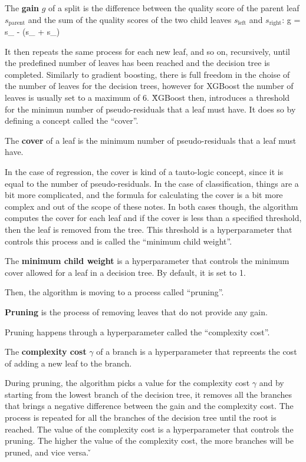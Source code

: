 \bd[Gain]
The \textbf{gain} $g$ of a split is the difference between the quality score of the parent leaf $s_{\text{parent}}$ and
the sum of the quality scores of the two child leaves $s_{\text{left}}$ and $s_{\text{right}}$:
\bse
g = s_{} - (s_{} + s_{})
\ese
\ed

It then repeats the same process for each new leaf, and so on, recursively, until the predefined number of
leaves has been reached and the decision tree is completed. Similarly to gradient boosting, there is full freedom in the
choise of the number of leaves for the decision trees, however for XGBoost the number of leaves is usually set to a
maximum of 6. \v

XGBoost then, introduces a threshold for the minimun number of pseudo-residuals that a leaf must have. It does so by
defining a concept called the ``cover''.

\bd[Cover]
The \textbf{cover} of a leaf is the minimum number of pseudo-residuals that a leaf must have.
\ed

In the case of regression, the cover is kind of a tauto-logic concept, since it is equal to the number of
pseudo-residuals. In the case of classification, things are a bit more complicated, and the formula for calculating
the cover is a bit more complex and out of the scope of these notes. In both cases though, the algorithm computes
the cover for each leaf and if the cover is less than a specified threshold, then the leaf is removed from the tree.
This threshold is a hyperparameter that controls this process and is called the ``minimum child weight''.

The \textbf{minimum child weight} is a hyperparameter that controls the minimum cover allowed for a leaf in a decision
tree. By default, it is set to 1.
\ed

Then, the algorithm is moving to a process called ``pruning''.

\bd[Pruning]
\textbf{Pruning} is the process of removing leaves that do not provide any gain.
\ed

Pruning happens through a hyperparameter called the ``complexity cost''.

The \textbf{complexity cost} $\gamma$ of a branch is a hyperparameter that repreents the cost of adding a new leaf to
the branch.
\ed

During pruning, the algorithm picks a value for the complexity cost $\gamma$ and by starting from the lowest branch
of the decision tree, it removes all the branches that brings a negative difference between the gain and the
complexity cost. The process is repeated for all the branches of the decision tree until the root is reached. The
value of the complexity cost is a hyperparameter that controls the pruning. The higher the value of the complexity
cost, the more branches will be pruned, and vice versa. \v

